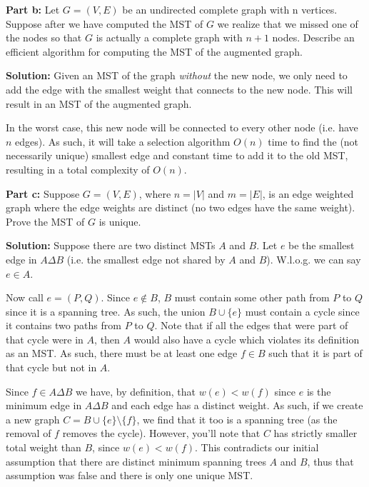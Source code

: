 \documentclass{article}
\begin{document}
\noindent\textbf{Part b:} Let $G=(V,E)$ be an undirected complete graph with n vertices. Suppose after we have computed the MST of $G$ we realize that we missed one of the nodes so that $G$ is actually a complete graph with $n+1$ nodes. Describe an efficient algorithm for computing the MST of the augmented graph.
\bigskip

\noindent\textbf{Solution:} Given an MST of the graph \textit{without} the new node, we only need to add the edge with the smallest weight that connects to the new node. This will result in an MST of the augmented graph.

In the worst case, this new node will be connected to every other node (i.e. have $n$ edges). As such, it will take a selection algorithm $O(n)$ time to find the (not necessarily unique) smallest edge and constant time to add it to the old MST, resulting in a total complexity of $O(n)$.
\bigskip

\noindent\textbf{Part c:} Suppose $G=(V,E)$, where $n=|V|$ and $m=|E|$, is an edge weighted graph where the edge weights are distinct (no two edges have the same weight). Prove the MST of $G$ is unique.
\bigskip

\noindent\textbf{Solution:} Suppose there are two distinct MSTs $A$ and $B$. Let $e$ be the smallest edge in $A\Delta B$ (i.e. the smallest edge not shared by $A$ and $B$). W.l.o.g. we can say $e\in A$.

Now call $e=(P,Q)$. Since $e\not\in B$, $B$ must contain some other path from $P$ to $Q$ since it is a spanning tree. As such, the union $B\cup\{e\}$ must contain a cycle since it contains two paths from $P$ to $Q$. Note that if all the edges that were part of that cycle were in $A$, then $A$ would also have a cycle which violates its definition as an MST. As such, there must be at least one edge $f\in B$ such that it is part of that cycle but not in $A$.

Since $f\in A\Delta B$ we have, by definition, that $w(e)<w(f)$ since $e$ is the minimum edge in $A\Delta B$ and each edge has a distinct weight. As such, if we create a new graph $C=B\cup\{e\}\setminus\{f\}$, we find that it too is a spanning tree (as the removal of $f$ removes the cycle). However, you'll note that $C$ has strictly smaller total weight than $B$, since $w(e)<w(f)$. This contradicts our initial assumption that there are distinct minimum spanning trees $A$ and $B$, thus that assumption was false and there is only one unique MST.
\end{document}
